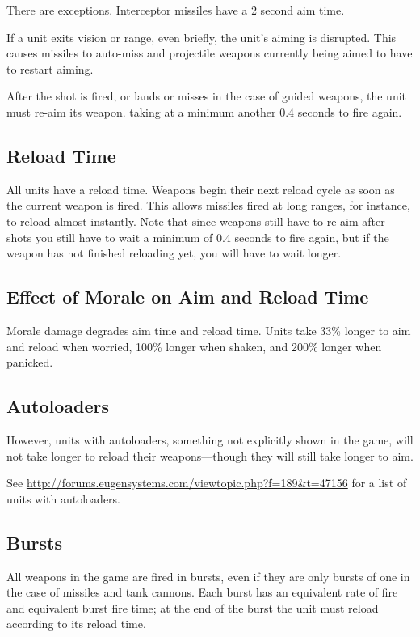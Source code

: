 \documentclass{article}
\begin{document}
There are exceptions. Interceptor missiles have a 2 second aim time.

If a unit exits vision or range, even briefly, the unit's aiming is disrupted.
This causes missiles to auto-miss and projectile weapons currently being aimed
to have to restart aiming.

After the shot is fired, or lands or misses in the case of guided weapons, the
unit must re-aim its weapon. taking at a minimum another 0.4 seconds to fire
again.

\subsection{Reload Time}

All units have a reload time. Weapons begin their next reload cycle as soon as
the current weapon is fired. This allows missiles fired at long ranges, for
instance, to reload almost instantly. Note that since weapons still have to
re-aim after shots you still have to wait a minimum of 0.4 seconds to fire
again, but if the weapon has not finished reloading yet, you will have to wait
longer.

\subsection{Effect of Morale on Aim and Reload Time}

Morale damage degrades aim time and reload time. Units take 33\% longer to aim
and reload when worried, 100\% longer when shaken, and 200\% longer when
panicked.

\subsection{Autoloaders}

However, units with autoloaders, something not explicitly shown in the game, 
will not take longer to reload their weapons---though they will still take longer to aim.

See \url{http://forums.eugensystems.com/viewtopic.php?f=189&t=47156} for a list
of units with autoloaders.

\subsection{Bursts}

All weapons in the game are fired in bursts, even if they are only
bursts of one in the case of missiles and tank cannons. Each burst has an
equivalent rate of fire and equivalent burst fire time; at the end of the burst
the unit must reload according to its reload time.
\end{document}
